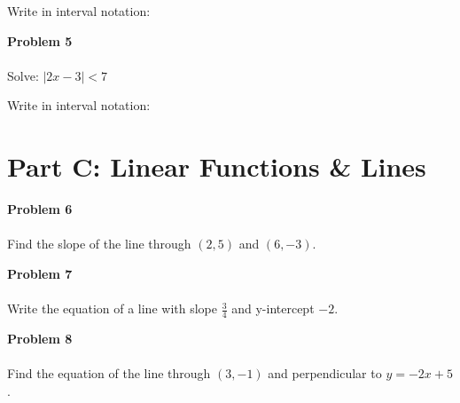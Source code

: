 \documentclass[12pt]{article}
\begin{document}
            \begin{center}
            \end{center}

            \vspace{1cm}

            Write in interval notation: \underline{\hspace{4cm}}

            \vspace{2cm}

            \textbf{Problem 5}\\\\
            Solve: $|2x - 3| < 7$

            \vspace{4cm}

            Write in interval notation: \underline{\hspace{4cm}}

            \newpage

        \section*{Part C: Linear Functions \& Lines}

            \textbf{Problem 6}\\\\
            Find the slope of the line through $(2, 5)$ and $(6, -3)$.

            \vspace{3cm}

            \textbf{Problem 7}\\\\
            Write the equation of a line with slope $\displaystyle\frac{3}{4}$ and y-intercept $-2$.

            \vspace{3cm}

            \textbf{Problem 8}\\\\
            Find the equation of the line through $(3, -1)$ and perpendicular to $y = -2x + 5$.

            \newpage
\end{document}
